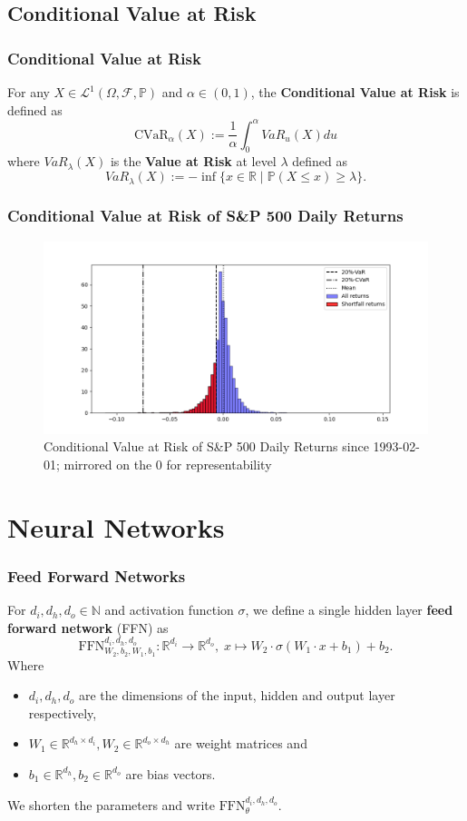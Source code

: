 \documentclass[serif]{beamer}
\def\R{{\mathbb R}}
\def\P{{\mathbb P}}
\def\N{{\mathbb N}}
\def\O{{\Omega}}
\def\cF{{\mathcal F}}
\def\L{{\mathcal L}}
\begin{document}
\subsection{Conditional Value at Risk}

\begin{frame}
    \frametitle{Conditional Value at Risk}
    For any $X \in \L^1 (\O, \cF, \P)$ and $\alpha \in (0,1)$,
    the \textbf{Conditional Value at Risk}
    is defined as
    $$\text{CVaR}_\alpha (X) := \frac{1}{\alpha} \int_0^\alpha VaR_u (X) du$$
    where $VaR_\lambda (X)$ is the \textbf{Value at Risk} at level $\lambda$ defined as
    $$VaR_\lambda (X) := - \inf \{ x \in \R \; | \; \P (X \leq x) \geq \lambda \}.$$
\end{frame}

\begin{frame}
    \frametitle{Conditional Value at Risk of S\&P 500 Daily Returns}
    \begin{figure}
        \includegraphics[width=1.0\textwidth]{./images/cvar_sp500_example.png}
        \caption{Conditional Value at Risk of S\&P 500 Daily Returns since 1993-02-01;
            mirrored on the $0$ for representability
        }
    \end{figure}
\end{frame}

\section{Neural Networks}

\begin{frame}
    \frametitle{Feed Forward Networks}
    For $d_i, d_h, d_o \in \N$
    and activation function $\sigma$,
    we define a single hidden layer \textbf{feed forward network} (FFN) as
    \[
        \text{FFN}_{W_2, b_2, W_1, b_1}^{d_i, d_h, d_o} : \R^{d_i} \to \R^{d_o}, \;
        x \mapsto W_2 \cdot \sigma (W_1 \cdot x + b_1) + b_2.
    \]
    Where
    \begin{itemize}
        \item $d_i, d_h, d_o$ are the dimensions of the input, hidden and output layer respectively,
        \item $W_1 \in \R^{d_h \times d_i}, W_2 \in \R^{d_o \times d_h}$ are weight matrices and
        \item $b_1 \in \R^{d_h}, b_2 \in \R^{d_o}$ are bias vectors.
    \end{itemize}
    We shorten the parameters and write $\text{FFN}_\theta^{d_i, d_h, d_o}$.
\end{frame}
\end{document}
